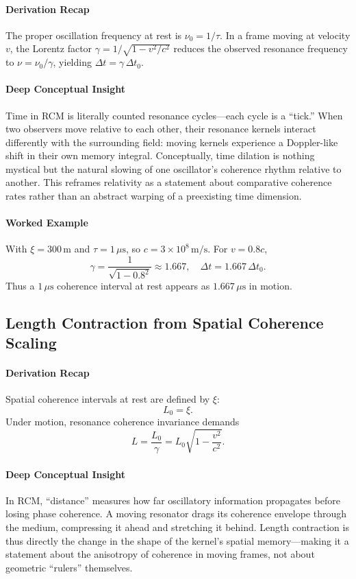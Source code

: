 \paragraph{Derivation Recap}  
The proper oscillation frequency at rest is \(\nu_0=1/\tau\). In a frame moving at velocity \(v\), the Lorentz factor \(\gamma=1/\sqrt{1-v^2/c^2}\) reduces the observed resonance frequency to \(\nu=\nu_0/\gamma\), yielding \(\Delta t=\gamma\,\Delta t_0\).

\paragraph{Deep Conceptual Insight}  
Time in RCM is literally counted resonance cycles—each cycle is a “tick.” When two observers move relative to each other, their resonance kernels interact differently with the surrounding field: moving kernels experience a Doppler-like shift in their own memory integral. Conceptually, time dilation is nothing mystical but the natural slowing of one oscillator’s coherence rhythm relative to another. This reframes relativity as a statement about comparative coherence rates rather than an abstract warping of a preexisting time dimension.

\paragraph{Worked Example}  
With \(\xi=300\,\mathrm{m}\) and \(\tau=1\,\mu\mathrm{s}\), so \(c=3\times10^8\,\mathrm{m/s}\). For \(v=0.8c\),
\[
  \gamma = \frac{1}{\sqrt{1-0.8^2}} \approx 1.667,
  \quad
  \Delta t = 1.667\,\Delta t_0.
\]
Thus a \(1\,\mu\mathrm{s}\) coherence interval at rest appears as \(1.667\,\mu\mathrm{s}\) in motion.

\subsection{Length Contraction from Spatial Coherence Scaling}

\paragraph{Derivation Recap}  
Spatial coherence intervals at rest are defined by \(\xi\):
\[
  L_0 = \xi.
\]
Under motion, resonance coherence invariance demands
\[
  L = \frac{L_0}{\gamma}
    = L_0\sqrt{1 - \frac{v^2}{c^2}}.
\]

\paragraph{Deep Conceptual Insight}  
In RCM, “distance” measures how far oscillatory information propagates before losing phase coherence. A moving resonator drags its coherence envelope through the medium, compressing it ahead and stretching it behind. Length contraction is thus directly the change in the shape of the kernel’s spatial memory—making it a statement about the anisotropy of coherence in moving frames, not about geometric “rulers” themselves.

